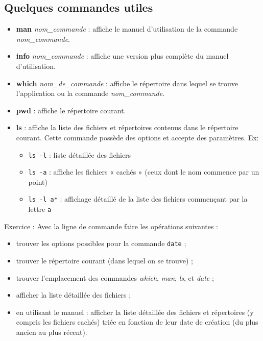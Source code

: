 \documentclass[12pt,a4paper]{article}
\begin{document}
\subsection{Quelques commandes utiles}
\begin{itemize}
\item \textbf{man} \textit{nom\_commande} : affiche le manuel d'utilisation de la
  commande \textit{nom\_commande}.
\item \textbf{info} \textit{nom\_commande} : affiche une version plus complète du manuel
  d'utilisation.
\item \textbf{which} \textit{ nom\_de\_commande} : affiche le répertoire dans lequel se
  trouve l'application ou la commande \textit{ nom\_commande}.
\item \textbf{pwd} : affiche le répertoire courant.
\item \textbf{ls} : affiche la liste des fichiers et répertoires contenus dans
  le répertoire courant. Cette commande possède des options et accepte
  des paramètres.  
  Ex:
  \begin{itemize}
  \item \texttt{ls -l} : liste détaillée des fichiers

  \item \texttt{ls -a} : affiche les fichiers « cachés » (ceux dont le
    nom commence par un point)
  \item \texttt{ls -l a*} : affichage détaillé de la liste
    des fichiers commençant par la lettre {\tt a}
  \end{itemize}
\end{itemize}

Exercice :
Avec la ligne de commande faire les opérations suivantes :
\begin{itemize}
\item trouver les options possibles pour la commande
  \texttt{date} ;
\item trouver le répertoire courant (dans lequel on se trouve) ;
\item trouver l'emplacement des commandes \textit{which},
  \textit{man}, \textit{ls}, et \textit{date} ;
\item afficher la liste détaillée des fichiers ;
\item en utilisant le manuel : afficher la liste détaillée des
  fichiers et répertoires (y compris les fichiers cachés) triée en
  fonction de leur date de création (du plus ancien au plus récent).
\end{itemize}
\end{document}
